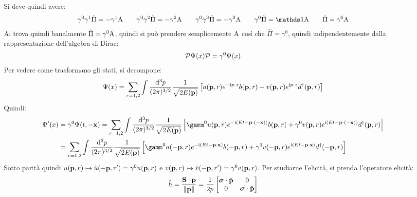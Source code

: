 Si deve quindi avere:
\begin{equation*}
  \gamma^0 \gamma^1 \hat{\Pi} = - \gamma^1 \mt{A}
  \qquad
  \gamma^0 \gamma^2 \hat{\Pi} = - \gamma^2 \mt{A}
  \qquad
  \gamma^0 \gamma^3 \hat{\Pi} = - \gamma^3 \mt{A}
  \qquad
  \gamma^0 \hat{\Pi} = \id \mt{A}
  \qquad
  \hat{\Pi} = \gamma^0 \mt{A}
\end{equation*}
Ai trova quindi banalmente $ \hat{\Pi} = \gamma^0 \mathrm{A} $, quindi si può prendere semplicemente $ \mathrm{A} $ così che $ \hat{\Pi} = \gamma^0 $, quindi indipendentemente dalla rappresentazione dell'algebra di Dirac:
\begin{equation}
  \mathcal{P} \Psi(x) \mathcal{P} = \gamma^0 \Psi(x)
\end{equation}
Per vedere come trasformano gli stati, si decompone:
\begin{equation*}
  \Psi(x) = \sum_{r = 1,2} \int \frac{\mathrm{d}^3p}{(2\pi)^{3/2}} \frac{1}{\sqrt{2E(\mathbf{p})}} \left[ u(\mathbf{p},r) e^{-\mathrm{i} p \cdot x} b(\mathbf{p},r) + v(\mathbf{p},r) e^{\mathrm{i} p \cdot x} d^\dagger(\mathbf{p},r) \right]
\end{equation*}
Quindi:
\begin{equation*}
  \begin{split}
    \Psi'(x)
    & = \gamma^0 \Psi(t,-\ve{x}) = \sum_{r = 1,2} \int \frac{\dd^3p}{(2\pi)^{3/2}} \frac{1}{\sqrt{2E(\ve{p})}} \left[ \gamm^0 u(\ve{p},r) e^{-\img (Et - \ve{p} \cdot (-\ve{x}))} b(\ve{p},r) + \gamma^0 v(\ve{p},r) e^{\img (Et - \ve{p} \cdot (-\ve{x}))} d\dg(\ve{p},r) \right] \\
    & = \sum_{r = 1,2} \int \frac{\dd^3p}{(2\pi)^{3/2}} \frac{1}{\sqrt{2E(\ve{p})}} \left[ \gamm^0 u(-\ve{p},r) e^{-\img (Et - \ve{p} \cdot \ve{x})} b(-\ve{p},r) + \gamma^0 v(-\ve{p},r) e^{\img (Et - \ve{p} \cdot \ve{x})} d\dg(-\ve{p},r) \right] \\
  \end{split}
\end{equation*}
Sotto parità quindi $ u(\mathbf{p},r) \mapsto \tilde{u}(-\mathbf{p},r') = \gamma^0 u(\mathbf{p},r) $ e $ v(\mathbf{p},r) \mapsto \tilde{v}(-\mathbf{p},r') = \gamma^0 v(\mathbf{p},r) $. Per studiarne l'elicità, si prenda l'operatore elicità:
\begin{equation*}
  \hat{h} = \frac{\mathbf{S} \cdot \mathbf{p}}{\left\lVert\mathbf{p}\right\rVert} = \frac{1}{2p}
  \begin{bmatrix}
    \boldsymbol{\sigma} \cdot \hat{\mathbf{p}} & 0 \\ 0 & \boldsymbol{\sigma} \cdot \hat{\mathbf{p}}
  \end{bmatrix}
\end{equation*}
